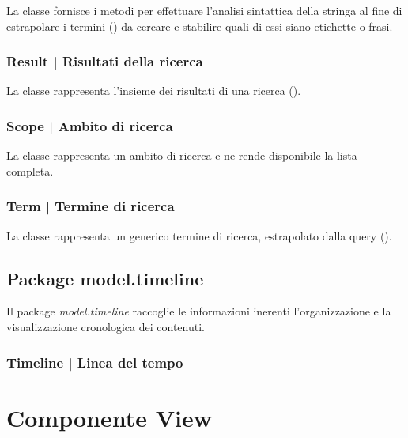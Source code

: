 \documentclass[10pt,a4paper,headinclude,footinclude,hidelinks]{scrreprt} %
\begin{document}
	La classe fornisce i metodi per effettuare l'analisi sintattica della stringa al fine di estrapolare i termini (\textit{}) da cercare e stabilire quali di essi siano etichette o frasi.

	\subsection[Result]{Result | Risultati della ricerca}
	\label{sec:stage:design:sistema:model.search:search-result}
	La classe \textit{} rappresenta l'insieme dei risultati di una ricerca (\textit{}).

	\subsection[Scope]{Scope | Ambito di ricerca}
	\label{sec:stage:design:sistema:model.search:search-scope}
	La classe \textit{} rappresenta un ambito di ricerca e ne rende disponibile la lista completa.

	\subsection[Term]{Term | Termine di ricerca}
	\label{sec:stage:design:sistema:model.search:search-term}
	La classe \textit{} rappresenta un generico termine di ricerca, estrapolato dalla query (\textit{}).

	\section{Package model.timeline}
	\label{sec:stage:design:sistema:model.timeline}
	Il package \textit{model.timeline} raccoglie le informazioni inerenti l'organizzazione e la visualizzazione cronologica dei contenuti.

	\subsection[Timeline]{Timeline | Linea del tempo}
	\label{sec:stage:design:sistema:model.timeline:timeline}

	\chapter{Componente View}
	\label{ch:stage:design:view}
\end{document}
